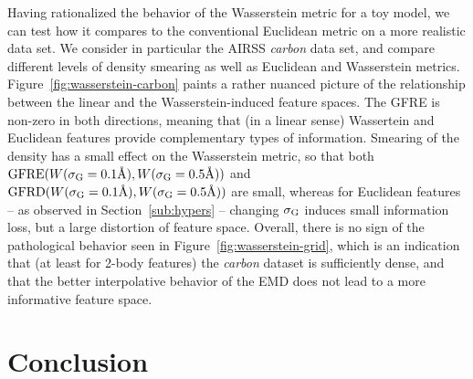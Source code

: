 Having rationalized the behavior of the Wasserstein metric for a toy model, we can test how it compares to the conventional Euclidean metric on a more realistic data set. We consider in particular the AIRSS \emph{carbon} data set, and compare different levels of density smearing as well as Euclidean and Wasserstein metrics. 
Figure~\ref{fig:wasserstein-carbon} paints a rather nuanced picture of the relationship between the linear and the Wasserstein-induced feature spaces. 
The GFRE is non-zero in both directions, meaning that (in a linear sense) Wassertein and Euclidean features provide complementary types of information. 
Smearing of the density has a small effect on the Wasserstein metric, so that both $\operatorname{GFRE}(W(\sigma_\text{G}=0.1\text{\AA}),W(\sigma_\text{G}=0.5\text{\AA}))$ and $\operatorname{GFRD}(W(\sigma_\text{G}=0.1\text{\AA}),W(\sigma_\text{G}=0.5\text{\AA}))$ are small, whereas for Euclidean features -- as observed in Section~\ref{sub:hypers} -- changing $\sigma_\text{G}$ induces small information loss, but a large distortion of feature space. 
Overall, there is no sign of the pathological behavior seen in Figure~\ref{fig:wasserstein-grid}, which is an indication that (at least for 2-body features) the \emph{carbon} dataset is sufficiently dense, and that the better interpolative behavior of the EMD does not lead to a more informative feature space. 




\section{Conclusion}

